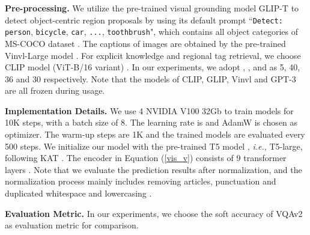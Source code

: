 \documentclass{article}
\begin{document}
\textbf{Pre-processing. } We utilize the pre-trained visual grounding model GLIP-T \cite{li2021grounded} to detect object-centric region proposals by using its default prompt ``\texttt{Detect:} \texttt{person}, \texttt{bicycle}, \texttt{car}, \texttt{...}, \texttt{toothbrush}", which contains all object categories of MS-COCO dataset \cite{lin2014microsoft}. The captions of images are obtained by the pre-trained Vinvl-Large model \cite{zhang2021vinvl}. For explicit knowledge and regional tag retrieval, we choose CLIP model (ViT-B/16 variant) \cite{radford2021learning}. In our experiments, we adopt , ,  and  as 5, 40, 36 and 30 respectively. Note that the models of CLIP, GLIP, Vinvl and GPT-3 are all frozen during usage.

\textbf{Implementation Details. } We use 4  NVIDIA V100 32Gb to train models for 10K steps, with a batch size of 8. The learning rate is  and AdamW \cite{loshchilov2017decoupled} is chosen as optimizer. The warm-up steps are 1K and the trained models are evaluated every 500 steps. We initialize our model with the pre-trained T5 model \cite{raffel2019exploring}, \textit{i.e.}, T5-large, following KAT \cite{gui2021kat}. The encoder  in Equation (\ref{vis_v}) consists of 9 transformer layers \cite{vaswani2017attention}. Note that we evaluate the prediction results after normalization, and the normalization process mainly includes removing articles, punctuation and duplicated whitespace and lowercasing \cite{chen2017reading, lee2019latent}. 

\textbf{Evaluation Metric. } In our experiments, we choose the soft accuracy of VQAv2 \cite{antol2015vqa} as evaluation metric for comparison.
\end{document}
